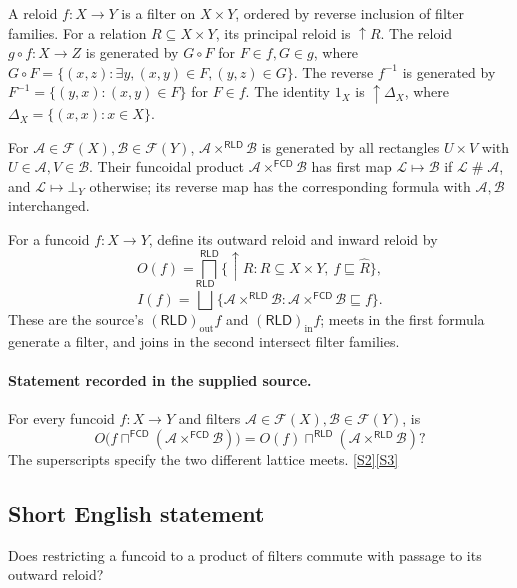 \documentclass[11pt]{article}
\newcommand{\sref}[2]{\hyperlink{source:#1:#2}{[S#2]}}
\begin{document}
A reloid $f:X\to Y$ is a filter on $X\times Y$, ordered by reverse inclusion of filter families. For a relation $R\subseteq X\times Y$, its principal reloid is $\uparrow R$. The reloid $g\circ f:X\to Z$ is generated by $G\circ F$ for $F\in f,G\in g$, where $G\circ F=\{(x,z):\exists y,(x,y)\in F,(y,z)\in G\}$. The reverse $f^{-1}$ is generated by $F^{-1}=\{(y,x):(x,y)\in F\}$ for $F\in f$. The identity $1_X$ is $\uparrow\Delta_X$, where $\Delta_X=\{(x,x):x\in X\}$.

For $\mathcal A\in\mathcal F(X),\mathcal B\in\mathcal F(Y)$, $\mathcal A\times^{\mathsf{RLD}}\mathcal B$ is generated by all rectangles $U\times V$ with $U\in\mathcal A,V\in\mathcal B$. Their funcoidal product $\mathcal A\times^{\mathsf{FCD}}\mathcal B$ has first map $\mathcal L\mapsto\mathcal B$ if $\mathcal L\mathrel{\#}\mathcal A$, and $\mathcal L\mapsto\bot_Y$ otherwise; its reverse map has the corresponding formula with $\mathcal A,\mathcal B$ interchanged.

For a funcoid $f:X\to Y$, define its outward reloid and inward reloid by
\[
 O(f)=\bigsqcap^{\mathsf{RLD}}\{\uparrow R:R\subseteq X\times Y,\ f\sqsubseteq\widehat R\},
\]
\[
 I(f)=\bigsqcup^{\mathsf{RLD}}\{\mathcal A\times^{\mathsf{RLD}}\mathcal B:
       \mathcal A\times^{\mathsf{FCD}}\mathcal B\sqsubseteq f\}.
\]
These are the source's $(\mathsf{RLD})_{\mathrm{out}}f$ and $(\mathsf{RLD})_{\mathrm{in}}f$; meets in the first formula generate a filter, and joins in the second intersect filter families.
\paragraph{Statement recorded in the supplied source.}
For every funcoid $f:X\to Y$ and filters $\mathcal A\in\mathcal F(X),\mathcal B\in\mathcal F(Y)$, is
\[
 O\bigl(f\sqcap^{\mathsf{FCD}}(\mathcal A\times^{\mathsf{FCD}}\mathcal B)\bigr)
 =O(f)\sqcap^{\mathsf{RLD}}(\mathcal A\times^{\mathsf{RLD}}\mathcal B)?
\]
The superscripts specify the two different lattice meets. \sref{3421}{2}\sref{3421}{3}
\subsection{Short English statement}
Does restricting a funcoid to a product of filters commute with passage to its outward reloid?
\end{document}
